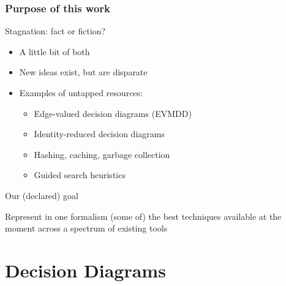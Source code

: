 \documentclass{beamer}
\begin{document}
\begin{frame}
  \frametitle{Purpose of this work}

\vfill
\begin{block}{Stagnation: fact or fiction?}
 \begin{itemize}
   \item A little bit of both
   \item New ideas exist, but are disparate
   \item Examples of untapped resources: 
     \begin{itemize}
       \item Edge-valued decision diagrams (EVMDD)
       \item Identity-reduced decision diagrams
       \item Hashing, caching, garbage collection
       \item Guided search heuristics
     \end{itemize}
 \end{itemize}
\end{block}

\vfill
 \begin{alertblock}{Our (declared) goal}
  \begin{center}
   Represent in one formalism (some of) the best techniques available at the moment
   across a spectrum of existing tools
  \end{center}
 \end{alertblock}
\vfill
\end{frame}

\section[BDD and MTBDD]{Decision Diagrams}
\end{document}
